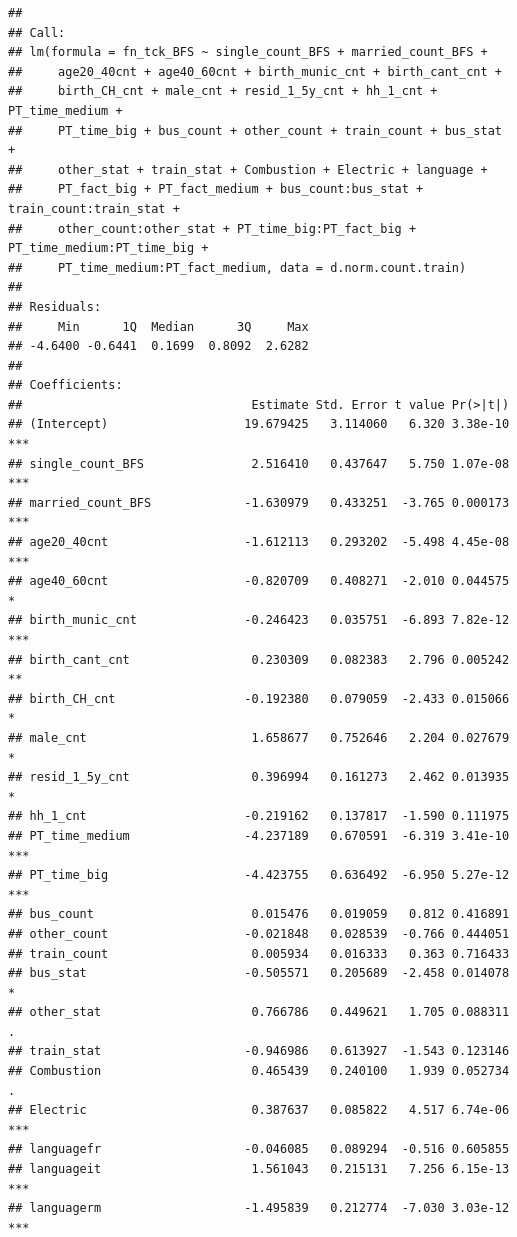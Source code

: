 \documentclass[
]{article}
\begin{document}
\begin{verbatim}
## 
## Call:
## lm(formula = fn_tck_BFS ~ single_count_BFS + married_count_BFS + 
##     age20_40cnt + age40_60cnt + birth_munic_cnt + birth_cant_cnt + 
##     birth_CH_cnt + male_cnt + resid_1_5y_cnt + hh_1_cnt + PT_time_medium + 
##     PT_time_big + bus_count + other_count + train_count + bus_stat + 
##     other_stat + train_stat + Combustion + Electric + language + 
##     PT_fact_big + PT_fact_medium + bus_count:bus_stat + train_count:train_stat + 
##     other_count:other_stat + PT_time_big:PT_fact_big + PT_time_medium:PT_time_big + 
##     PT_time_medium:PT_fact_medium, data = d.norm.count.train)
## 
## Residuals:
##     Min      1Q  Median      3Q     Max 
## -4.6400 -0.6441  0.1699  0.8092  2.6282 
## 
## Coefficients:
##                                Estimate Std. Error t value Pr(>|t|)    
## (Intercept)                   19.679425   3.114060   6.320 3.38e-10 ***
## single_count_BFS               2.516410   0.437647   5.750 1.07e-08 ***
## married_count_BFS             -1.630979   0.433251  -3.765 0.000173 ***
## age20_40cnt                   -1.612113   0.293202  -5.498 4.45e-08 ***
## age40_60cnt                   -0.820709   0.408271  -2.010 0.044575 *  
## birth_munic_cnt               -0.246423   0.035751  -6.893 7.82e-12 ***
## birth_cant_cnt                 0.230309   0.082383   2.796 0.005242 ** 
## birth_CH_cnt                  -0.192380   0.079059  -2.433 0.015066 *  
## male_cnt                       1.658677   0.752646   2.204 0.027679 *  
## resid_1_5y_cnt                 0.396994   0.161273   2.462 0.013935 *  
## hh_1_cnt                      -0.219162   0.137817  -1.590 0.111975    
## PT_time_medium                -4.237189   0.670591  -6.319 3.41e-10 ***
## PT_time_big                   -4.423755   0.636492  -6.950 5.27e-12 ***
## bus_count                      0.015476   0.019059   0.812 0.416891    
## other_count                   -0.021848   0.028539  -0.766 0.444051    
## train_count                    0.005934   0.016333   0.363 0.716433    
## bus_stat                      -0.505571   0.205689  -2.458 0.014078 *  
## other_stat                     0.766786   0.449621   1.705 0.088311 .  
## train_stat                    -0.946986   0.613927  -1.543 0.123146    
## Combustion                     0.465439   0.240100   1.939 0.052734 .  
## Electric                       0.387637   0.085822   4.517 6.74e-06 ***
## languagefr                    -0.046085   0.089294  -0.516 0.605855    
## languageit                     1.561043   0.215131   7.256 6.15e-13 ***
## languagerm                    -1.495839   0.212774  -7.030 3.03e-12 ***

\end{verbatim}
\end{document}
